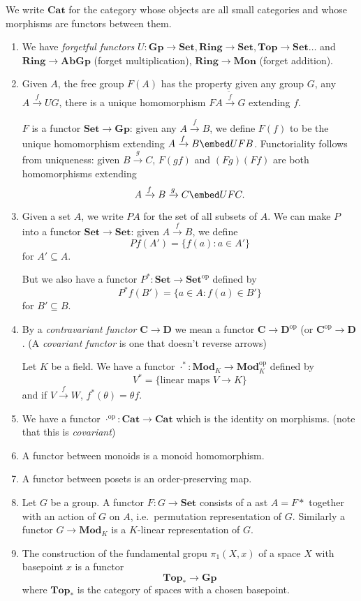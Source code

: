 \documentclass[a4paper]{article}
\renewcommand{\c}[1]{\mathbf{#1}}
\newcommand{\Set}{{\c{Set}}}
\newcommand{\Top}{{\c{Top}}}
\begin{document}
\begin{eg}
  We write \(\c{Cat}\) for the category whose objects are all small categories and whose morphisms are functors between them.
\end{eg}

\begin{eg}\leavevmode
  \begin{enumerate}
  \item We have \emph{forgetful functors} \(U: \c{Gp} \to \Set, \c{Ring} \to \Set, \Top \to \Set \dots\) and \(\c{Ring} \to \c{AbGp}\) (forget multiplication), \(\c{Ring} \to \c{Mon}\) (forget addition).
  \item Given \(A\), the free group \(F(A)\) has the property given any group \(G\), any \(A \xrightarrow{f} U G\), there is a unique homomorphism \(FA \xrightarrow{\tilde f} G\) extending \(f\).

    \(F\) is a functor \(\Set \to \c{Gp}\): given any \(A \xrightarrow{f} B\), we define \(F(f)\) to be the unique homomorphism extending \(A \xrightarrow{f} B \embed U FB\). Functoriality follows from uniqueness: given \(B \xrightarrow{g} C\), \(F(gf)\) and \((Fg)(Ff)\) are both homomorphisms extending
    \[
      A \xrightarrow{f} B \xrightarrow{g} C \embed U F C.
    \]
  \item Given a set \(A\), we write \(PA\) for the set of all subsets of \(A\). We can make \(P\) into a functor \(\Set \to \Set\): given \(A \xrightarrow{f} B\), we define
    \[
      Pf(A') = \{f(a): a \in A'\}
    \]
    for \(A' \subseteq A\).

    But we also have a functor \(P^*: \Set \to \Set^{\text{op}}\) defined by
    \[
      P^*f(B') = \{a \in A: f(a) \in B'\}
    \]
    for \(B' \subseteq B\).
  \item By a \emph{contravariant functor} \(\c C \to \c D\) we mean a functor \(\c C \to \c D^{\text{op}}\) (or \(\c C^{\text{op}} \to \c D\). (A \emph{covariant functor} is one that doesn't reverse arrows)

    Let \(K\) be a field. We have a functor \(\cdot^*: \c{Mod}_K \to \c{Mod}^{\text{op}}_K\) defined by
    \[
      V^* = \{\text{linear maps } V \to K\}
    \]
    and if \(V \xrightarrow{f} W\), \(f^*(\theta) = \theta f\).
  \item We have a functor \(\cdot^\text{op}: \c{Cat} \to \c{Cat}\) which is the identity on morphisms. (note that this is \emph{covariant})
  \item A functor between monoids is a monoid homomorphism.
  \item A functor between posets is an order-preserving map.
  \item Let \(G\) be a group. A functor \(F: G \to \Set\) consists of a ast \(A = F*\) together with an action of \(G\) on \(A\), i.e.\ permutation representation of \(G\). Similarly a functor \(G \to \c{Mod}_K\) is a \(K\)-linear representation of \(G\).
  \item The construction of the fundamental gropu \(\pi_1(X, x)\) of a space \(X\) with basepoint \(x\) is a functor
    \[
      \Top_* \to \c{Gp}
    \]
    where \(\Top_*\) is the category of spaces with a chosen basepoint.


\end{enumerate}
\end{eg}
\end{document}
